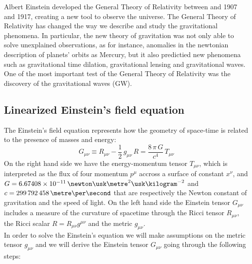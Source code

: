 Albert Einstein developed the General Theory of Relativity between and 1907 and 1917, creating a new tool to observe the universe. 
The General Theory of Relativity has changed the way we describe and study the gravitational phenomena. 
In particular, the new theory of gravitation was not only able to solve unexplained observations, as for instance, anomalies in the newtonian description of planets' orbits as Mercury, but it also predictied new  phenomena such as gravitational time dilation, gravitational lensing and gravitational waves.
One of the most important test of the General Theory of Relativity was the discovery of the gravitational waves (GW). %
\\
\subsection{Linearized Einstein's field equation}
The Einstein's field equation represents how the geometry of space-time is related to the presence of masses and energy:
\begin{equation}
\label{einstein_eq}
G_{\mu \nu} \equiv R_{\mu \nu} - \dfrac{1}{2} \,  g_{\mu \nu} \, R =\dfrac{8 \, \pi \, G}{c^4}  \, T_{\mu \nu}
\end{equation}
On the right hand side we have the energy-momentum tensor $T_{\mu \nu}$, which is interpreted as the flux of four momentum $p^\mu$ accross a surface of constant $x^\nu$, and $G=6.67408\times 10^{-11} \, \newton \usk \metre^2 \usk \kilogram^{-2}$ and $c=299\,792\,458 \,\metre \per \second$ that are respectively the Newton constant of gravitation and the speed of light. 
On the left hand side the Einstein tensor $G_{\mu \nu}$ includes a measure of the curvature of spacetime through the Ricci tensor $R_{\mu \nu}$, the Ricci scalar $R = R_{\mu \nu} g^{\mu \nu} $ and the metric $g_{\mu \nu}$. \\
In order to solve the Einstein's equation we will make assumptions on the metric tensor $g_{\mu \nu}$ and we will derive the Einstein tensor $G_{\mu \nu}$ going through the following steps:
